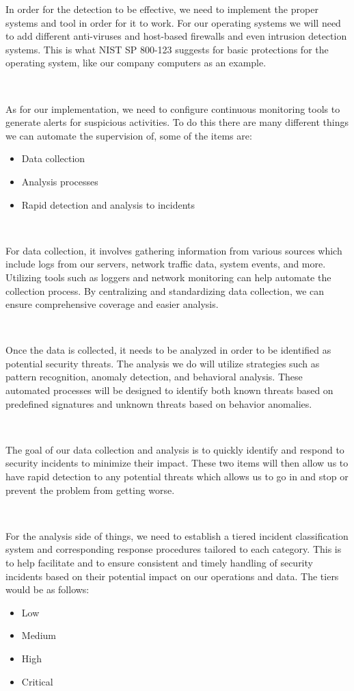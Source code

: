 \documentclass[12pt,a4paper]{report}
\begin{document}
In order for the detection to be effective, we need to implement the proper systems and tool in order for it to work.
For our operating systems we will need to add different anti-viruses and host-based firewalls and even intrusion detection systems.
This is what NIST SP 800-123 suggests for basic protections for the operating system, like our company computers as an example.

\

As for our implementation, we need to configure continuous monitoring tools to generate alerts for suspicious activities.
To do this there are many different things we can automate the supervision of, some of the items are:
\begin{itemize}
 \item Data collection
 \item Analysis processes
 \item Rapid detection and analysis to incidents
\end{itemize}
\

For data collection, it involves gathering information from various sources which include logs from our servers, network traffic data, system events, and more. 
Utilizing tools such as loggers and network monitoring can help automate the collection process.
By centralizing and standardizing data collection, we can ensure comprehensive coverage and easier analysis.

\

Once the data is collected, it needs to be analyzed in order to be identified as potential security threats. 
The analysis we do will utilize strategies such as pattern recognition, anomaly detection, and behavioral analysis. 
These automated processes will be designed to identify both known threats based on predefined signatures and unknown threats based on behavior anomalies.

\

The goal of our data collection and analysis is to quickly identify and respond to security incidents to minimize their impact.
These two items will then allow us to have rapid detection to any potential threats which allows us to go in and stop or prevent the problem from getting worse.

\

For the analysis side of things, we need to establish a tiered incident classification system and corresponding response procedures tailored to each category.
This is to help facilitate and to ensure consistent and timely handling of security incidents based on their potential impact on our operations and data.
The tiers would be as follows:
\begin{itemize}
 \item Low
 \item Medium
 \item High
 \item Critical
\end{itemize}
\end{document}
